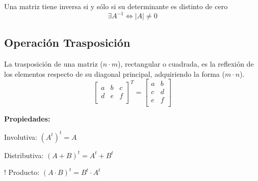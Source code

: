 \begin{theorem}
    Una matriz tiene inversa si y sólo si su determinante es distinto
    de cero
    \begin{equation*}
        \exists A^{-1} \Leftrightarrow |A| \neq 0
    \end{equation*}
\end{theorem}


\subsection{Operación Trasposición}
La trasposición de una matriz ($n \cdot m$), rectangular o cuadrada, es la
reflexión de los elementos respecto de su diagonal principal, adquiriendo
la forma ($m \cdot n$).
\begin{equation*}
    \begin{bmatrix}
        a & b & c \\
        d & e & f \\
    \end{bmatrix}^{T}  =
    \begin{bmatrix}
        a & b \\
        c & d \\
        e & f \\
    \end{bmatrix}
\end{equation*}

\textbf{Propiedades:}
\begin{bangenumerate}
    \item Involutiva: $(A^t)^t = A$
    \item Distributiva: $(A+B)^t = A^t + B^t$
    \item! Producto: $(A \cdot B)^t = B^t \cdot A^t$
\end{bangenumerate}


\newpage
